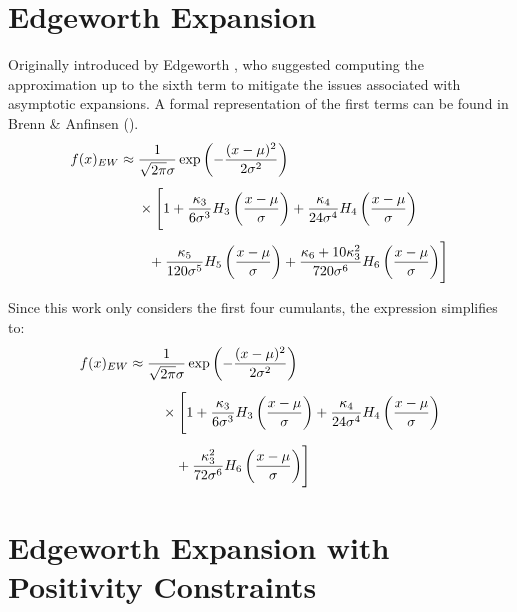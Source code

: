 \section{Edgeworth Expansion}
Originally introduced by Edgeworth \citeyear{edgeworthRepresentationStatisticalFrequency1907}, who suggested computing the approximation up to the sixth term to mitigate the issues associated with asymptotic expansions. A formal representation of the first terms can be found in Brenn \& Anfinsen (\citeyear{brennRevisitGramCharlierEdgeworth2017}).
\begin{align}
    f(x)_{EW} \approx &\; \frac{1}{\sqrt{2\pi}\sigma}\exp\left(-\frac{(x-\mu)^2}{2\sigma^2}\right) \notag\\[1ex]
    &\; \times \Biggl[ 1 
        + \frac{\kappa_3}{6\sigma^3}H_3\left(\frac{x-\mu}{\sigma}\right) + \frac{\kappa_4}{24\sigma^4}H_4\left(\frac{x-\mu}{\sigma}\right) \notag\\[1ex]
    &\quad + \frac{\kappa_5}{120\sigma^5}H_5\left(\frac{x-\mu}{\sigma}\right) + \frac{\kappa_6 + 10\kappa_3^2}{720\sigma^6}H_6\left(\frac{x-\mu}{\sigma}\right)
    \Biggr] \notag
\end{align}
    
Since this work only considers the first four cumulants, the expression simplifies to:
\begin{align}
    f(x)_{EW} \approx {} & \frac{1}{\sqrt{2\pi}\sigma}\exp\left(-\frac{(x-\mu)^2}{2\sigma^2}\right)\notag\\[1ex]
    & \quad \times \Biggl[ 1 
       + \frac{\kappa_3}{6\sigma^3}H_3\left(\frac{x-\mu}{\sigma}\right) + \frac{\kappa_4}{24\sigma^4}H_4\left(\frac{x-\mu}{\sigma}\right) \notag\\[1ex]
    \label{eq:ew_expansion_short}
    & \quad \quad + \frac{\kappa_3^2}{72\sigma^6}H_6\left(\frac{x-\mu}{\sigma}\right)
    \Biggr]
\end{align}    

\section{Edgeworth Expansion with Positivity Constraints}

